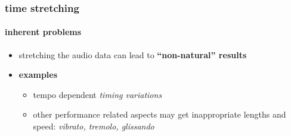 \begin{frame}\frametitle{time stretching}\framesubtitle{inherent problems}
	\begin{itemize}
		\item	stretching the audio data can lead to \textbf{``non-natural'' results}
		\pause
        \bigskip
		\item	\textbf{examples}
			\begin{itemize}
				\item tempo dependent \textit{timing variations }
				\pause
				\item	other performance related aspects may get inappropriate lengths and speed: \textit{vibrato, tremolo, glissando}
			\end{itemize}
	\end{itemize}
\end{frame}
